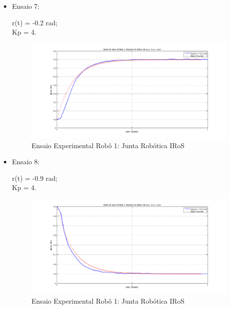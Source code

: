 \documentclass[12pt,oneside,a4paper, chapter=TITLE, section = TITLE, english, brazil]{abntex2}
\begin{document}
\begin{itemize}
\item Ensaio 7:
 
r(t) = -0.2 rad;\\
Kp = 4.\\

\begin{figure}[h] %
\centering
\includegraphics[scale=0.43]{./imagens/Simu4_1_robo}
\caption[Ensaio Experimental Robô 1: Junta Robótica IRoS]{Ensaio Experimental Robô 1: Junta Robótica IRoS}
\label{fig:simu4_1_robo}
\end{figure}


\item Ensaio 8:
 
r(t) = -0.9 rad;\\
Kp = 4.\\

\begin{figure}[h] %
\centering
\includegraphics[scale=0.42]{./imagens/Simu4_2_robo}
\caption[Ensaio Experimental Robô 1: Junta Robótica IRoS]{Ensaio Experimental Robô 1: Junta Robótica IRoS}
\label{fig:simu4_2_robo}
\end{figure}


\end{itemize}
\end{document}
